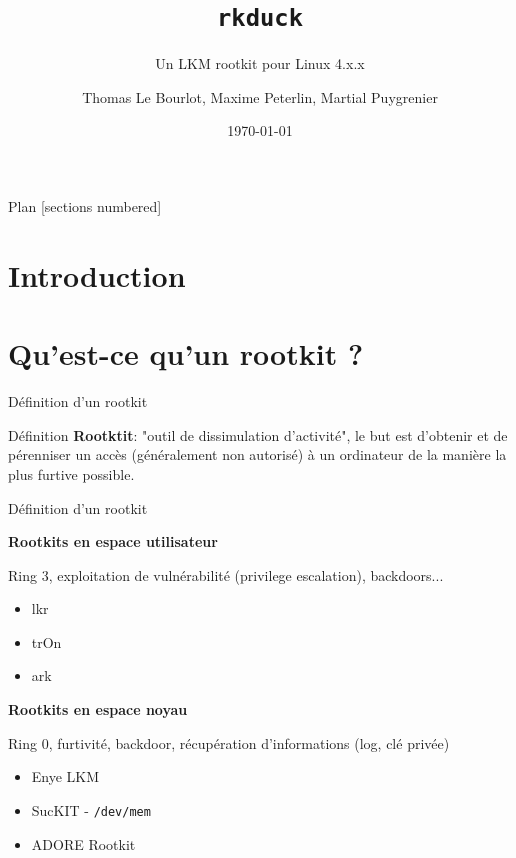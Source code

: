 \documentclass[10pt]{beamer}
\title{\texttt{rkduck}}
\subtitle{Un LKM rootkit pour Linux 4.x.x}
\date{\today}
\author{Thomas Le Bourlot, Maxime Peterlin, Martial Puygrenier}
\institute{Université de Bordeaux}
\begin{document}
\maketitle

\begin{frame}{Plan}
  [sections numbered]
  \tableofcontents[hideallsubsections]
\end{frame}

\section*{Introduction}


\section{Qu'est-ce qu'un rootkit ?}


	

	\begin{frame}{Définition d'un rootkit}
	
	\begin{alertblock}{Définition}
		\textbf{Rootktit}: "outil de dissimulation d'activité", le but est d'obtenir et de pérenniser un accès (généralement non autorisé) à un ordinateur de la manière la plus furtive possible.
    \end{alertblock}
    
	\end{frame}
	
		\begin{frame}{Définition d'un rootkit}

    
			\textbf{Rootkits en espace utilisateur}
			
			Ring 3, exploitation de vulnérabilité (privilege escalation), backdoors...
			\begin{itemize}
				\item lkr
				\item trOn
				\item ark
			\end{itemize}
			
			\textbf{Rootkits en espace noyau}
			
			Ring 0, furtivité, backdoor, récupération d'informations (log, clé privée)
			\begin{itemize}
				\item Enye LKM
				\item SucKIT - \texttt{/dev/mem}
				\item ADORE Rootkit
			\end{itemize}
		\end{frame}
\end{document}
